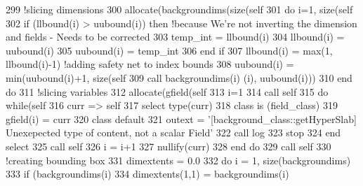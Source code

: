 \begin{DoxyCode}
299     \textcolor{comment}{!slicing dimensions}
300     \textcolor{keyword}{allocate}(backgroundims(\textcolor{keyword}{size}(self%
301     \textcolor{keywordflow}{do} i=1, \textcolor{keyword}{size}(self%
302         \textcolor{keywordflow}{if} (llbound(i) > uubound(i)) \textcolor{keywordflow}{then} \textcolor{comment}{!because We're not inverting the dimension and fields - Needs to
       be corrected}
303             temp\_int = llbound(i)
304             llbound(i) = uubound(i)
305             uubound(i) = temp\_int
306 \textcolor{keywordflow}{        end if}
307         llbound(i) = max(1, llbound(i)-1) \textcolor{comment}{!adding safety net to index bounds}
308         uubound(i) = min(uubound(i)+1, \textcolor{keyword}{size}(self%
309         \textcolor{keyword}{call }backgroundims(i)%
      (i), uubound(i)))
310 \textcolor{keywordflow}{    end do}
311     \textcolor{comment}{!slicing variables}
312     \textcolor{keyword}{allocate}(gfield(self%
313     i=1
314     \textcolor{keyword}{call }self%
315     \textcolor{keywordflow}{do} \textcolor{keywordflow}{while}(self%
316         curr => self%
317         \textcolor{keywordflow}{select type}(curr)
318 \textcolor{keywordflow}{        class is} (field\_class)
319             gfield(i) = curr%
320 \textcolor{keywordflow}{            class default}
321             outext = \textcolor{stringliteral}{'[background\_class::getHyperSlab] Unexepected type of content, not a scalar Field'}
322             \textcolor{keyword}{call }log%
323             stop
324 \textcolor{keywordflow}{        end select}
325         \textcolor{keyword}{call }self%
326         i = i+1
327         \textcolor{keyword}{nullify}(curr)
328 \textcolor{keywordflow}{    end do}
329     \textcolor{keyword}{call }self%
330     \textcolor{comment}{!creating bounding box}
331     dimextents = 0.0
332     \textcolor{keywordflow}{do} i = 1, \textcolor{keyword}{size}(backgroundims)
333         \textcolor{keywordflow}{if} (backgroundims(i)%
334             dimextents(1,1) = backgroundims(i)%

\end{DoxyCode}
